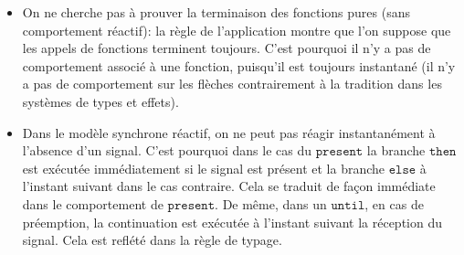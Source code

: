 \documentclass[9pt,preprint]{sigplanconf}
\begin{document}
\begin{itemize}

\item On ne cherche pas à prouver la terminaison des fonctions \ocaml{} pures (sans comportement réactif): la règle de l'application montre que l'on suppose que les appels de fonctions terminent toujours. C'est pourquoi il n'y a pas de comportement associé à une fonction, puisqu'il est toujours instantané (il n'y a pas de comportement sur les flèches contrairement à la tradition dans les systèmes de types et effets).

\item Dans le modèle synchrone réactif, on ne peut pas réagir instantanément à l'absence d'un signal. C'est pourquoi dans le cas du $\mathtt{present}$ la branche $\mathtt{then}$ est exécutée immédiatement si le signal est présent et la branche $\mathtt{else}$ à l'instant suivant dans le cas contraire. Cela se traduit de façon immédiate dans le comportement de $\mathtt{present}$.
  De même, dans un $\mathtt{until}$, en cas de préemption, la
  continuation est exécutée à l'instant suivant la réception du
  signal. Cela est reflété dans la règle de typage.



\end{itemize}
\end{document}
